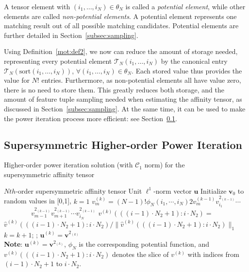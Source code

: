 A tensor element with $(i_1,\ldots,i_N)\in \theta_N$ is called a \emph{potential element}, while other elements are called \emph{non-potential elements}.
A potential element represents one matching result out of all possible matching candidates.
Potential elements are further detailed in  Section~\ref{subsec:sampling}.

Using Definition~\ref{mot:def2}, we now can reduce the amount of storage needed, representing every potential element $\mathcal{T}_N(i_1,\ldots,i_N)$ by the canonical entry $\mathcal{T}_N(\mathrm{sort}(i_1,\ldots,i_N))$, $\forall (i_1,\ldots,i_N)\in \theta_N$. Each stored value thus provides the value for $N!$ entries.
Furthermore, as non-potential elements all have value zero, there is no need to store them.
This greatly reduces both storage, and the amount of feature tuple sampling
needed  when estimating the affinity tensor, as discussed in Section~\ref{subsec:sampling}.
At the same time, it can be used to make the power iteration process more efficient: see Section~\ref{subsec:oursymmhopm}.

\subsection{Supersymmetric Higher-order Power Iteration}
\label{subsec:oursymmhopm}

\begin{algorithm}[!t]
\caption{\small Higher-order power iteration solution (with $\mathcal{C}_1$ norm) for the \protect\\
         \mbox{}\hspace{15ex}\small supersymmetric affinity tensor }
\label{alg2}
\begin{algorithmic}[1]
\REQUIRE \small $N{th}$-order supersymmetric affinity tensor
\ENSURE  \small Unit $\mathcal{\ell}^1$-norm vector $\boldsymbol{u}$
\STATE   \small \; Initialize $\boldsymbol{v}_0$ to random values in [0,1], $k=1$
\REPEAT
        \STATE $v_{m}^{(k)}=(N-1)!\phi_N(i_1,\cdots , i_N) 2v_{m}^{(k-1)}v_{i_1}^{2_{(k-1)}}\cdots$ \\
                 $\qquad \qquad v_{m-1}^{2_{(k-1)}}v_{m+1}^{2_{(k-1)}}\cdots v_{i_N}^{2_{(k-1)}}$
        \ENDFOR
        \STATE $v^{(k)}(((i-1)\cdot N_2+1) : i\cdot N_2)=$   \protect\\
               $\hat{v}^{(k)}(((i-1)\cdot N_2+1) : i\cdot N_2)/\lVert \hat{v}^{(k)}(((i-1)\cdot N_2+1):i\cdot N_2)\lVert_1$
        \ENDFOR
    \ENDFOR
    \STATE $k=k+1$;
;
\STATE   \small \; $\boldsymbol{u}^{(k)}=\boldsymbol{v}^{2_{(k)}}$ \protect\\
       \small \textbf{Note}: $\boldsymbol{u}^{(k)}=\boldsymbol{v}^{2_{(k)}}$, $\phi_N$ is the corresponding potential function,
       \small and $v^{(k)}(((i-1)\cdot N_2+1) : i\cdot N_2)$ denotes the slice of $v^{(k)}$ with
       \small indices from $(i-1)\cdot N_2+1$ to $i\cdot N_2$.
\end{algorithmic}
\end{algorithm}

